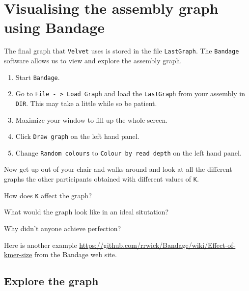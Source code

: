 \section{Visualising the assembly graph using Bandage}

The final graph that \texttt{Velvet} uses is stored in the file \texttt{LastGraph}. The \texttt{Bandage} software allows us to view and explore the assembly graph.
\begin{steps}
\begin{enumerate}
\item Start \texttt{Bandage}.
\item Go to \texttt{File - > Load Graph} and load the \texttt{LastGraph} from your assembly in \texttt{DIR}. This may take a little while so be patient.
\item Maximize your window to fill up the whole screen.
\item Click \texttt{Draw graph} on the left hand panel.
\item Change \texttt{Random colours} to \texttt{Colour by read depth} on the left hand panel.
\end{enumerate}
\end{steps}

Now get up out of your chair and walks around and look at all the different graphs the other participants obtained with different values of \texttt{K}.
\begin{questions}
How does \texttt{K} affect the graph? \\
\begin{answer}
\end{answer}
What would the graph look like in an ideal situtation? \\
\begin{answer}
\end{answer}
Why didn't anyone achieve perfection? \\
\begin{answer}
\end{answer}
\end{questions}

Here is another example \url{https://github.com/rrwick/Bandage/wiki/Effect-of-kmer-size} from the Bandage web site. %

\subsection{Explore the graph}

